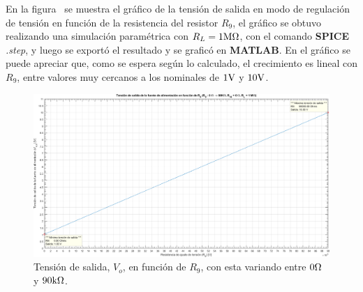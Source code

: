 \vspace{1.5cm}


En la figura~ se muestra el gráfico de la tensión de salida en modo de regulación de tensión en función de la resistencia del resistor $R_{9}$, el gráfico se obtuvo realizando una simulación paramétrica con $R_{L} = 1 \si[per-mode=symbol]{\mega\ohm}$, con el comando \textbf{SPICE} \textit{.step}, y luego se exportó el resultado y se graficó en \textbf{MATLAB}. En el gráfico se puede apreciar que, como se espera según lo calculado, el crecimiento es lineal con $R_{9}$, entre valores muy cercanos a los nominales de $1 \si[per-mode=symbol]{\volt}$ y $10 \si[per-mode=symbol]{\volt}$.




\vfill

\clearpage

\begin{figure}[H] %
\begin{center}
\includegraphics[width=1.2 \textwidth, angle=90]{./img/preguntas/p6.png}
\caption{\label{fig:fig_p6_output_voltage}\footnotesize{Tensión de salida, $V_{o}$, en función de $R_{9}$, con esta variando entre $0 \si[per-mode=symbol]{\ohm}$ y $90 \si[per-mode=symbol]{\kilo\ohm}$.}}
\end{center}
\end{figure}



\clearpage